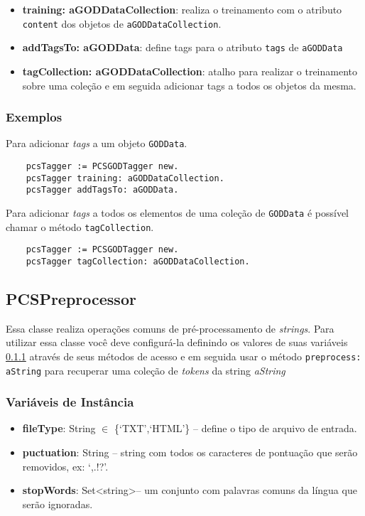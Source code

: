 \begin{itemize}
    \item \textbf{training: aGODDataCollection}: realiza o treinamento com o atributo \texttt{content}                                  
                                          dos objetos de \texttt{aGODDataCollection}.
    \item \textbf{addTagsTo: aGODData}: define tags para o atributo \texttt{tags} de \texttt{aGODData}
    \item \textbf{tagCollection: aGODDataCollection}: atalho para realizar o treinamento sobre uma
                                         coleção e em seguida adicionar tags a todos os objetos
                                         da mesma.
 \end{itemize}


\subsubsection{Exemplos}
    Para adicionar \textit{tags} a um objeto \texttt{GODData}.
    \begin{verbatim}
    pcsTagger := PCSGODTagger new.
    pcsTagger training: aGODDataCollection.
    pcsTagger addTagsTo: aGODData.
    \end{verbatim}
    
    Para adicionar \textit{tags} a todos os elementos de uma coleção de \texttt{GODData} é
    possível chamar o método \texttt{tagCollection}.
    \begin{verbatim}
    pcsTagger := PCSGODTagger new.
    pcsTagger tagCollection: aGODDataCollection.
    \end{verbatim}


\subsection{PCSPreprocessor}
Essa classe realiza operações comuns de pré-processamento de \textit{strings}. 
Para utilizar essa classe você deve configurá-la definindo os valores de suas variáveis 
\ref{pre-variaveis} através de seus métodos de acesso e em seguida usar o método
\texttt{preprocess: aString} para recuperar uma coleção de \textit{tokens} da string 
\textit{aString}


\subsubsection{Variáveis de Instância} \label{pre-variaveis}
\begin{itemize}
 \item  \textbf{fileType}: String $\in$ \{`TXT',`HTML'\} -- define o tipo de arquivo de entrada.
 \item  \textbf{puctuation}: String -- string com todos os caracteres de pontuação que  serão removidos,
                     ex: `,.!?'.
 \item  \textbf{stopWords}: Set<string>-- um conjunto com palavras comuns da língua que serão ignoradas.
\end{itemize}


